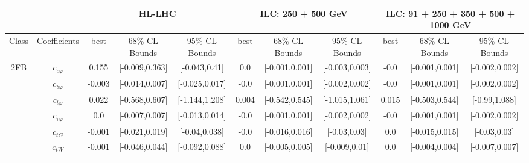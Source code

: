 \documentclass{article}
\begin{document}
\begin{table}[H]
\centering
\begin{tabular}{|c|c|c|c|c|c|c|c|c|c|c|}
\hline
 &  & \multicolumn{3}{c|}{HL-LHC} & \multicolumn{3}{c|}{ILC: 250 + 500 GeV} & \multicolumn{3}{c|}{ILC: 91 + 250 + 350 + 500 + 1000 GeV} \\ \hline
Class & Coefficients & best & 68\% CL Bounds & 95\% CL Bounds & best & 68\% CL Bounds & 95\% CL Bounds & best & 68\% CL Bounds & 95\% CL Bounds\\ \hline
\multirow{23}{*}{2FB}
 & $c_{c \varphi}$ & 0.155                             & [-0.009,0.363]                                 & [-0.043,0.41] & 0.0                             & [-0.001,0.001]                                 & [-0.003,0.003] & -0.0                             & [-0.001,0.001]                                 & [-0.002,0.002] \\ \cline{2-11}
 & $c_{b \varphi}$ & -0.003                             & [-0.014,0.007]                                 & [-0.025,0.017] & -0.0                             & [-0.001,0.001]                                 & [-0.002,0.002] & -0.0                             & [-0.001,0.001]                                 & [-0.002,0.002] \\ \cline{2-11}
 & $c_{t \varphi}$ & 0.022                             & [-0.568,0.607]                                 & [-1.144,1.208] & 0.004                             & [-0.542,0.545]                                 & [-1.015,1.061] & 0.015                             & [-0.503,0.544]                                 & [-0.99,1.088] \\ \cline{2-11}
 & $c_{\tau \varphi}$ & 0.0                             & [-0.007,0.007]                                 & [-0.013,0.014] & -0.0                             & [-0.001,0.001]                                 & [-0.002,0.002] & -0.0                             & [-0.001,0.001]                                 & [-0.002,0.002] \\ \cline{2-11}
 & $c_{tG}$ & -0.001                             & [-0.021,0.019]                                 & [-0.04,0.038] & -0.0                             & [-0.016,0.016]                                 & [-0.03,0.03] & 0.0                             & [-0.015,0.015]                                 & [-0.03,0.03] \\ \cline{2-11}
 & $c_{tW}$ & -0.001                             & [-0.046,0.044]                                 & [-0.092,0.088] & 0.0                             & [-0.005,0.005]                                 & [-0.009,0.01] & 0.0                             & [-0.004,0.004]                                 & [-0.007,0.007] \\ \cline{2-11}

\end{tabular}
\end{table}
\end{document}
